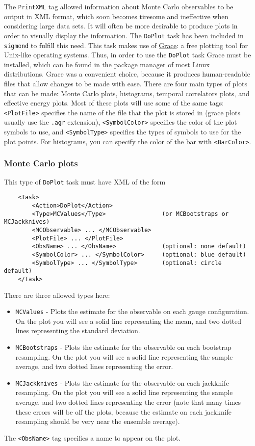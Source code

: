 \documentclass[12pt]{article}
\newcommand{\vb}{\texttt}
\begin{document}
The \vb{PrintXML} tag allowed information about Monte Carlo observables to be output
in XML format, which soon becomes tiresome and ineffective when considering large data sets.
It will often be more desirable to produce plots in order to visually display the information.
The \vb{DoPlot} task has been included in \vb{sigmond} to fulfill this need. This task makes
use of \href{http://plasma-gate.weizmann.ac.il/Grace/}{Grace}: a free plotting tool
for Unix-like operating systems. Thus, in order to use the \vb{DoPlot} task Grace must
be installed, which can be found in the package manager of most Linux distributions.
Grace was a convenient choice, because it produces human-readable files that allow
changes to be made with ease. 
There are four main types of plots that can be made: Monte Carlo plots,
histograms, temporal correlators plots, and effective energy plots.
Most of these plots will use some of the same tags: \vb{<PlotFile>}
specifies the name of the file that the plot is stored in (grace plots
usually use the \vb{.agr} extension), \vb{<SymbolColor>}
specifies the color of the plot symbols to use, and \vb{<SymbolType>}
specifies the types of symbols to use for the plot points.
For histograms, you can specify the color of the bar
with \vb{<BarColor>}.

\subsubsection{Monte Carlo plots}
This type of \vb{DoPlot} task must have XML of the form
\begin{verbatim}
    <Task>
        <Action>DoPlot</Action>
        <Type>MCValues</Type>                (or MCBootstraps or MCJackknives)
        <MCObservable> ... </MCObservable>
        <PlotFile> ... </PlotFile>
        <ObsName> ... </ObsName>             (optional: none default)
        <SymbolColor> ... </SymbolColor>     (optional: blue default)
        <SymbolType> ... </SymbolType>       (optional: circle default)
    </Task>
\end{verbatim}
There are three allowed types here:
\begin{itemize}
\item \vb{MCValues} - Plots the estimate for the observable on each gauge configuration. On the
plot you will see a solid line representing the mean, and two dotted lines representing the
standard deviation.
\item \vb{MCBootstraps} - Plots the estimate for the observable on each bootstrap resampling. On the
plot you will see a solid line representing the sample average, and two dotted lines representing the
error.
\item \vb{MCJackknives} - Plots the estimate for the observable on each jackknife resampling. On the
plot you will see a solid line representing the sample average, and two dotted lines representing the
error (note that many times these errors will be off the plots, because the estimate on each
jackknife resampling should be very near the ensemble average).
\end{itemize}
The \vb{<ObsName>} tag specifies a name to appear on the plot.
\end{document}
